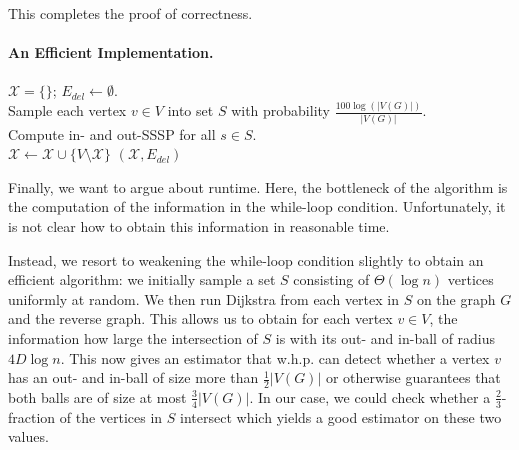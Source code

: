 This completes the proof of correctness.

\paragraph{An Efficient Implementation.}

\begin{algorithm}
$\mathcal{X} = \{\}$;  $E_{del} \gets \emptyset$.\\
{\color{red}Sample each vertex $v \in V$ into set $S$ with probability $\frac{100 \log(|V(G)|)}{|V(G)|}$.}\\
{\color{red} Compute in- and out-SSSP for all $s \in S$.}\\
$\mathcal{X} \gets \mathcal{X} \cup \{ V \setminus \mathcal{X}\}$\label{lne:addCluster} 
\Return $(\mathcal{X} , E_{del} )$
\caption{$\textsc{ComputeDirectedLDD}(G, D)$}
\label{alg:directedLDDEff}
\end{algorithm}

Finally, we want to argue about runtime. Here, the bottleneck of the algorithm is the computation of the information in the while-loop condition. Unfortunately, it is not clear how to obtain this information in reasonable time.

Instead, we resort to weakening the while-loop condition slightly to obtain an efficient algorithm: we initially sample a set $S$ consisting of $\Theta(\log n)$ vertices uniformly at random. We then run Dijkstra from each vertex in $S$ on the graph $G$ and the reverse graph. This allows us to obtain for each vertex $v \in V$, the information how large the intersection of $S$ is with its out- and in-ball of radius $4D\log n$. This now gives an estimator that w.h.p. can detect whether a vertex $v$ has an out- and in-ball of size more than $\frac{1}{2}|V(G)|$ or otherwise guarantees that both balls are of size at most $\frac{3}{4}|V(G)|$. In our case, we could check whether a $\frac{2}{3}$-fraction of the vertices in $S$ intersect which yields a good estimator on these two values.

